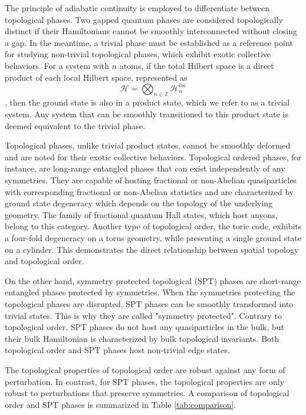 The principle of adiabatic continuity is employed to differentiate between topological phases. Two gapped quantum phases are considered topologically distinct if their Hamiltonians cannot be smoothly interconnected without closing a gap.  In the meantime, a trivial phase must be established as a reference point for studying non-trivial topological phases, which exhibit exotic collective behaviors.
 For a system with $n$ atoms, if the total Hilbert space is a direct product of each local Hilbert space, represented as $$\mathscr H = \bigotimes_{n\in \mathbb Z}  \mathscr H^{loc}_n$$
 , then the ground state is also in a product state, which we refer to as a trivial system. Any system that can be smoothly transitioned to this product state is deemed equivalent to the trivial phase.


Topological phases, unlike trivial product states, cannot be smoothly deformed and are noted for their exotic collective behaviors. Topological ordered phases, for instance, are long-range entangled phases that can exist independently of any symmetries. They are capable of hosting fractional or non-Abelian quasiparticles with corresponding fractional or non-Abelian statistics and are characterized by ground state degeneracy which depends on the topology of the underlying geometry. The family of fractional quantum Hall states, which host anyons, belong to this category. Another type of topological order, the toric code, exhibits a four-fold degeneracy on a torus geometry, while presenting a single ground state on a cylinder. This demonstrates the direct relationship between spatial topology and topological order.

On the other hand, symmetry protected topological (SPT) phases are short-range entangled phases protected by symmetries. When the symmetries protecting the topological phases are disrupted, SPT phases can be smoothly transformed into trivial states. This is why they are called "symmetry protected". Contrary to topological order, SPT phases do not host any quasiparticles in the bulk, but their bulk Hamiltonian is characterized by bulk topological invariants. Both topological order and SPT phases host non-trivial edge states.

The topological properties of topological order are robust against any form of perturbation. In contrast, for SPT phases, the topological properties are only robust to perturbations that preserve symmetries. A comparison of topological order and SPT phases is summarized in Table \ref{tab:comparison}.



